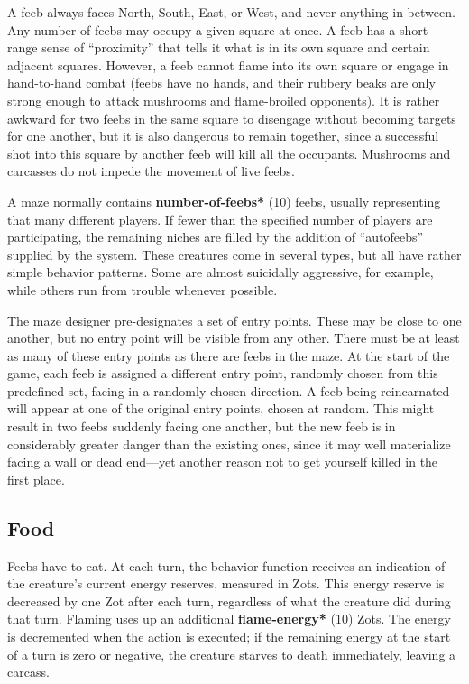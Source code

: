 \documentclass[12pt]{article}
\begin{document}
A feeb always faces North, South, East, or West, and never anything in
between.  Any number of feebs may occupy a given square at once.  A feeb
has a short-range sense of ``proximity'' that tells it what is in its own
square and certain adjacent squares.  However, a feeb cannot flame into
its own square or engage in hand-to-hand combat (feebs have no hands,
and their rubbery beaks are only strong enough to attack mushrooms and
flame-broiled opponents).  It is rather awkward for two feebs in the
same square to disengage without becoming targets for one another, but
it is also dangerous to remain together, since a successful shot into
this square by another feeb will kill all the occupants.  Mushrooms and
carcasses do not impede the movement of live feebs.

A maze normally contains {\bf *number-of-feebs*} (10) feebs, usually
representing that many different players.  If fewer than the specified
number of players are participating, the remaining niches are filled by
the addition of ``autofeebs'' supplied by the system.  These creatures
come in several types, but all have rather simple behavior patterns.
Some are almost suicidally aggressive, for example, while others run
from trouble whenever possible.

The maze designer pre-designates a set of entry points.  These may be
close to one another, but no entry point will be visible from any
other.  There must be at least as many of these entry points as there
are feebs in the maze.  At the start of the game, each feeb is
assigned a different entry point, randomly chosen from this predefined
set, facing in a randomly chosen direction.  A feeb being reincarnated
will appear at one of the original entry points, chosen at random.
This might result in two feebs suddenly facing one another, but the
new feeb is in considerably greater danger than the existing ones,
since it may well materialize facing a wall or dead end---yet another
reason not to get yourself killed in the first place.

\subsection {Food}

Feebs have to eat.  At each turn, the behavior function receives an
indication of the creature's current energy reserves, measured in Zots.
This energy reserve is decreased by one Zot after each turn, regardless
of what the creature did during that turn.  Flaming uses up an
additional {\bf *flame-energy*} (10) Zots.  The energy is decremented when
the action is executed; if the remaining energy at the start of a turn
is zero or negative, the creature starves to death immediately, leaving
a carcass.
\end{document}
